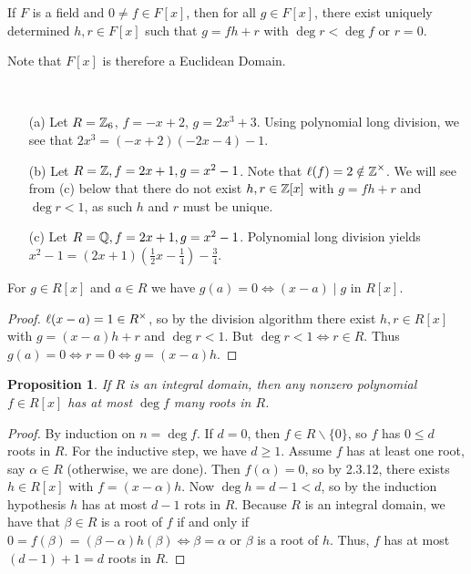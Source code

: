 \documentclass[11pt]{book}
\newcounter{counter}
\newtheorem{proposition}[counter]{Proposition}   \newtheorem{problem}[counter]{Problem}   \newtheorem*{proposition*}{Proposition}   \newtheorem*{lemma*}{Lemma}
\theoremstyle{definition}   \newtheorem{defn}[counter]{Definition} %
\newcommand{\bs}{\backslash}   \newcommand{\A}{\mathcal{A}}   \newcommand{\sy}{\textnormal{Syl}}   \newcommand{\size}[1]{\left| #1 \right|}
\newcommand{\vs}{\vspace{8pt}}
\numberwithin{counter}{chapter}
\begin{document}
\vs

\begin{corollary}
If $F$ is a field and $0 \ne f \in F[x]$, then for all $g \in F[x]$, there exist uniquely determined $h,r \in F[x]$ such that $g = fh + r$ with $\deg r < \deg f$ or $r=0$.

Note that $F[x]$ is therefore a Euclidean Domain.
\end{corollary}

\vs

\begin{example}
\
\begin{enumerate}
\item[(a)] Let $R = \operatorname{\mathbb{Z}}_6$, $f = -x +2$, $g = 2x^3+3$. Using polynomial long division, we see that $2x^3 = (-x+2)(-2x-4)-1$.
\item[(b)] Let $R = \operatorname{\mathbb{Z}}, f = 2x+1, g=x^2-1$. Note that $\ell(f) = 2 \notin \operatorname{\mathbb{Z}}^{\times}$. We will see from (c) below that there do not exist $h,r \in \operatorname{\mathbb{Z}}[x]$ with $g=fh+r$ and $\deg r < 1$, as such $h$ and $r$ must be unique.
\item[(c)] Let $R=\operatorname{\mathbb{Q}}, f=2x+1,g=x^2-1$. Polynomial long division yields $x^2-1 = (2x+1)(\frac{1}{2}x-\frac{1}{4})-\frac{3}{4}$.
\end{enumerate}
\end{example}

\vs

\begin{lemma}
For $g \in R[x]$ and $a \in R$ we have $g(a) = 0 \iff (x-a) \mid g$ in $R[x]$.
\end{lemma}

\begin{proof}
$\ell(x-a) = 1 \in R^{\times}$, so by the division algorithm there exist $h,r \in R[x]$ with $g = (x-a)h + r$ and $\deg r < 1$. But $\deg r < 1 \iff r \in R$. Thus $g(a) = 0 \iff r=0 \iff g = (x-a)h$.
\end{proof}

\vs

\begin{proposition}
If $R$ is an integral domain, then any nonzero polynomial $f \in R[x]$ has at most $\deg f$ many roots in $R$.
\end{proposition}

\begin{proof}
By induction on $n = \deg f$. If $d = 0$, then $f \in R\bs\{0\}$, so $f$ has $0 \leq d$ roots in $R$. For the inductive step, we have $d \geq 1$. Assume $f$ has at least one root, say $\alpha \in R$ (otherwise, we are done). Then $f(\alpha) = 0$, so by 2.3.12, there exists $h \in R[x]$ with $f=(x-\alpha)h$. Now $\deg h = d-1 < d$, so by the induction hypothesis $h$ has at most $d-1$ rots in $R$. Because $R$ is an integral domain, we have that $\beta \in R$ is a root of $f$ if and only if $0 = f(\beta) = (\beta - \alpha)h(\beta) \iff \beta = \alpha$ or $\beta$ is a root of $h$. Thus, $f$ has at most $(d-1)+1 = d$ roots in $R$.
\end{proof}
\end{document}
